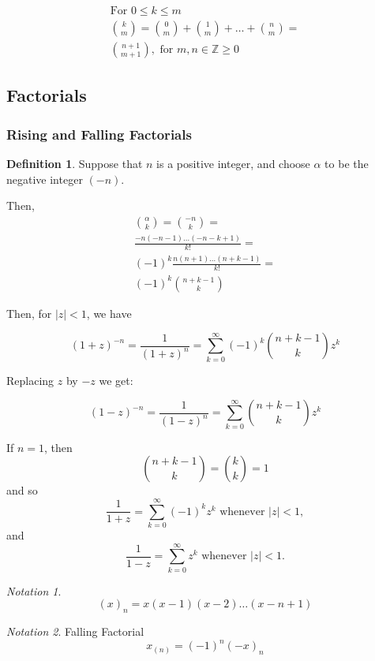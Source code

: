 \documentclass[10pt,a4paper,titlepage,twoside,draft]{article}
\theoremstyle{plain}
\theoremstyle{definition}
\newtheorem{defn}{Definition}
\theoremstyle{remark}
\newtheorem{nota}{Notation}
\begin{document}
\begin{eqnarray}
\text{For } 0 \leq k \leq m \\
\binom{k}{m} = \binom{0}{m} + \binom{1}{m} + \ldots + \binom{n}{m} = \\
\binom{n+1}{m+1}, \text{ for } m,n \in \mathbb{Z} \geq 0
\end{eqnarray}

\pagebreak

\subsection{Factorials}

\subsubsection{Rising and Falling Factorials}

\begin{defn}
Suppose that $n$ is a positive integer, and choose $\alpha$ to be the negative integer $(-n)$. 

Then, 
\begin{eqnarray}
\binom{\alpha}{k} = \binom{-n}{k} = \\
\frac{-n(-n-1) \ldots (-n-k+1)}{k!} = \\
(-1)^{k} \frac{n(n+1) \ldots (n+k-1)}{k!} = \\ 
(-1)^{k} \binom{n+k-1}{k}
\end{eqnarray}

Then, for $|z| < 1$, we have

\[(1+z)^{-n} = \frac{1}{(1+z)^{n}} = \sum_{k=0}^{\infty} (-1)^{k} \binom{n+k-1}{k} z^{k}\]

Replacing $z$ by $-z$ we get:

\[(1-z)^{-n} = \frac{1}{(1-z)^{n}} = \sum_{k=0}^{\infty} \binom{n+k-1}{k} z^{k}\]

If $n=1$, then \[\binom{n+k-1}{k} = \binom{k}{k} =1\] 
and so \[\frac{1}{1+z} = \sum_{k=0}^{\infty} (-1)^{k}z^{k} \text{ whenever } |z| < 1,\] 
and \[\frac{1}{1-z} = \sum_{k=0}^{\infty} z^{k} \text{ whenever } |z| <1.\]
\end{defn}

\medskip

\begin{nota}
    \[(x)_{n} = x(x-1)(x-2) \ldots (x-n+1)\]
\end{nota}

\medskip



\begin{nota}{Falling Factorial} \\
\[x_{(n)}={(-1)}^{n}{(-x)}_{n}\]
\end{nota}
\end{document}
